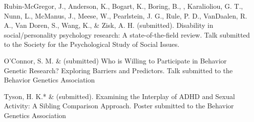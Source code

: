 

\item Rubin-McGregor, J., Anderson, K., Bogart, K., Boring, B., \meb, Karalioliou, G. T., Nunn, L., McManus, J., Meese, W., Pearlstein, J. G., Rule, P. D., VanDaalen, R. A., Van Doren, S., Wang, K., \& Zisk, A. H. (submitted). Disability in social/personality psychology research: A state-of-the-field review. Talk submitted to the Society for the Psychological Study of Social Issues. 

\item O'Connor, S. M. \& \meb (submitted) Who is Willing to Participate in Behavior Genetic Research? Exploring Barriers and Predictors. Talk submitted to the Behavior Genetics Association

\item Tyson, H. K.* \& \meb (submitted). Examining the Interplay of ADHD and Sexual Activity: A Sibling Comparison Approach. Poster submitted to the Behavior Genetics Association




